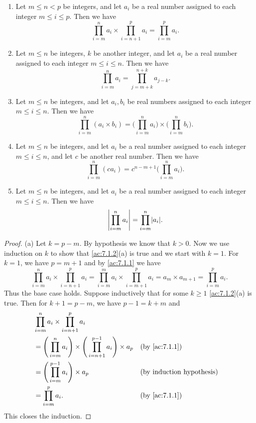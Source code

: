 \begin{ac}\label{ac:7.1.2}
  \begin{enumerate}
    \item Let \(m \leq n < p\) be integers, and let \(a_i\) be a real number assigned to each integer \(m \leq i \leq p\).
          Then we have
          \[
            \prod_{i = m}^n a_i \times \prod_{i = n + 1}^p a_i = \prod_{i = m}^p a_i.
          \]
    \item Let \(m \leq n\) be integers, \(k\) be another integer, and let \(a_i\) be a real number assigned to each integer \(m \leq i \leq n\).
          Then we have
          \[
            \prod_{i = m}^n a_i = \prod_{j = m + k}^{n + k} a_{j - k}.
          \]
    \item Let \(m \leq n\) be integers, and let \(a_i, b_i\) be real numbers assigned to each integer \(m \leq i \leq n\).
          Then we have
          \[
            \prod_{i = m}^n (a_i \times b_i) = \Bigg(\prod_{i = m}^n a_i\Bigg) \times \Bigg(\prod_{i = m}^n b_i\Bigg).
          \]
    \item Let \(m \leq n\) be integers, and let \(a_i\) be a real number assigned to each integer \(m \leq i \leq n\), and let \(c\) be another real number.
          Then we have
          \[
            \prod_{i = m}^n (ca_i) = c^{n - m + 1} \Bigg(\prod_{i = m}^n a_i\Bigg).
          \]
    \item Let \(m \leq n\) be integers, and let \(a_i\) be a real number assigned to each integer \(m \leq i \leq n\).
          Then we have
          \[
            \abs{\prod_{i = m}^n a_i} = \prod_{i = m}^n \abs{a_i}.
          \]
  \end{enumerate}
\end{ac}

\begin{proof}{(a)}
  Let \(k = p - m\).
  By hypothesis we know that \(k > 0\).
  Now we use induction on \(k\) to show that \cref{ac:7.1.2}(a) is true and we start with \(k = 1\).
  For \(k = 1\), we have \(p = m + 1\) and by \cref{ac:7.1.1} we have
  \[
    \prod_{i = m}^n a_i \times \prod_{i = n + 1}^p a_i = \prod_{i = m}^m a_i \times \prod_{i = m + 1}^p a_i = a_m \times a_{m + 1} = \prod_{i = m}^p a_i.
  \]
  Thus the base case holds.
  Suppose inductively that for some \(k \geq 1\) \cref{ac:7.1.2}(a) is true.
  Then for \(k + 1 = p - m\), we have \(p - 1 = k + m\) and
  \begin{align*}
     & \prod_{i = m}^n a_i \times \prod_{i = n + 1}^p a_i                                                               \\
     & = \Bigg(\prod_{i = m}^n a_i\Bigg) \times \Bigg(\prod_{i = n + 1}^{p - 1} a_i\Bigg) \times a_p &  & \by{ac:7.1.1} \\
     & = \Bigg(\prod_{i = m}^{p - 1} a_i\Bigg) \times a_p                                            &  & \byIH         \\
     & = \prod_{i = m}^p a_i.                                                                        &  & \by{ac:7.1.1}
  \end{align*}
  This closes the induction.
\end{proof}

